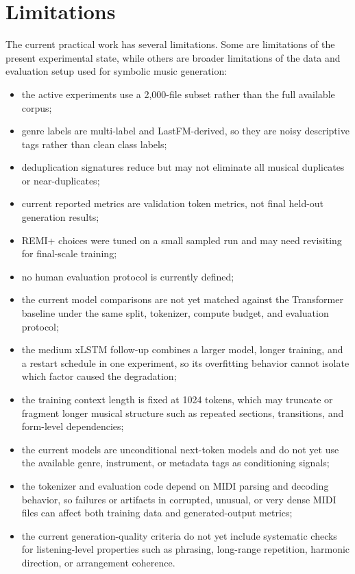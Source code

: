 \section{Limitations}

The current practical work has several limitations. Some are limitations of the
present experimental state, while others are broader limitations of the data and
evaluation setup used for symbolic music generation:
\begin{itemize}
	\item the active experiments use a 2,000-file subset rather than the full available corpus;
	\item genre labels are multi-label and LastFM-derived, so they are noisy descriptive tags rather than clean class labels;
	\item deduplication signatures reduce but may not eliminate all musical duplicates or near-duplicates;
	\item current reported metrics are validation token metrics, not final held-out generation results;
	\item REMI+ choices were tuned on a small sampled run and may need revisiting for final-scale training;
	\item no human evaluation protocol is currently defined;
	\item the current model comparisons are not yet matched against the Transformer baseline under the same split, tokenizer, compute budget, and evaluation protocol;
	\item the medium xLSTM follow-up combines a larger model, longer training, and a restart schedule in one experiment, so its overfitting behavior cannot isolate which factor caused the degradation;
	\item the training context length is fixed at 1024 tokens, which may truncate or fragment longer musical structure such as repeated sections, transitions, and form-level dependencies;
	\item the current models are unconditional next-token models and do not yet use the available genre, instrument, or metadata tags as conditioning signals;
	\item the tokenizer and evaluation code depend on MIDI parsing and decoding behavior, so failures or artifacts in corrupted, unusual, or very dense MIDI files can affect both training data and generated-output metrics;
	\item the current generation-quality criteria do not yet include systematic checks for listening-level properties such as phrasing, long-range repetition, harmonic direction, or arrangement coherence.
\end{itemize}

